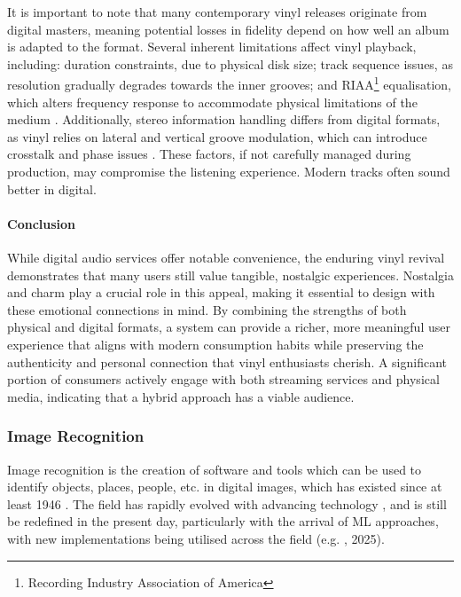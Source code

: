                 It is important to note that many contemporary vinyl releases originate from digital masters, meaning potential losses in fidelity depend on how well an album is adapted to the format. Several inherent limitations affect vinyl playback, including: duration constraints, due to physical disk size; track sequence issues, as resolution gradually degrades towards the inner grooves; and RIAA\footnote{Recording Industry Association of America} equalisation, which alters frequency response to accommodate physical limitations of the medium \cite{engineeringvinyls}. Additionally, stereo information handling differs from digital formats, as vinyl relies on lateral and vertical groove modulation, which can introduce crosstalk and phase issues \cite{engineeringvinyls}. These factors, if not carefully managed during production, may compromise the listening experience. Modern tracks often sound better in digital.
    
            \paragraph{Conclusion}
                While digital audio services offer notable convenience, the enduring vinyl revival demonstrates that many users still value tangible, nostalgic experiences. Nostalgia and charm play a crucial role in this appeal, making it essential to design with these emotional connections in mind. By combining the strengths of both physical and digital formats, a system can provide a richer, more meaningful user experience that aligns with modern consumption habits while preserving the authenticity and personal connection that vinyl enthusiasts cherish. A significant portion of consumers actively engage with both streaming services and physical media, indicating that a hybrid approach has a viable audience.
    
        \subsubsection{Image Recognition}
    
    
            Image recognition is the creation of software and tools which can be used to identify objects, places, people, etc. in digital images, which has existed since at least 1946 \cite{hall1979computer}. The field has rapidly evolved with advancing technology \cite{imagenetclasscnn}, and is still be redefined in the present day, particularly with the arrival of ML approaches, with new implementations being utilised across the field (e.g. \cite{RAMPRASAD2025100556}, 2025).
    
